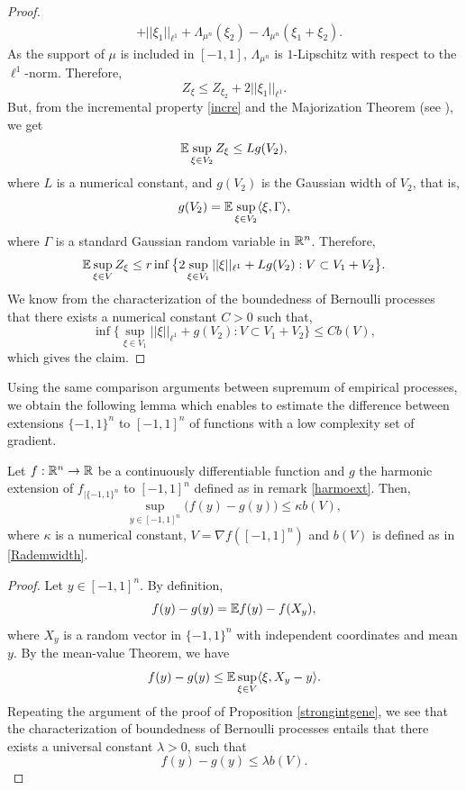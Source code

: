 \documentclass[a4paper,oneside,11pt]{article}
\begin{document}
\begin{proof}
\begin{align*}
& + ||\xi_1||_{\ell^1} +  \Lambda_{\mu^n}(\xi_2)-\Lambda_{\mu^n}(\xi_1+\xi_2).
\end{align*}
As the support of $\mu$ is included in $[-1,1]$, $\Lambda_{\mu^n}$ is $1$-Lipschitz with respect to the $\ell^1$-norm. Therefore, 
$$  Z_{\xi} \leq Z_{\xi_2} + 2 ||\xi_1||_{\ell^1}.$$
But, from the incremental property \eqref{incre} and the Majorization Theorem (see \cite[Theorem 12.16]{LT}), we get 
$$ \mathbb{E} \sup_{\xi \in V_2 } Z_{\xi} \leq L g(V_2),$$
where $L$ is a numerical constant, and $g(V_2)$ is the Gaussian width of $V_2$, that is,
$$ g(V_2) = \mathbb{E} \sup_{\xi \in V_2} \langle \xi, \Gamma \rangle,$$
where $\Gamma$ is a standard Gaussian random variable in $\mathbb{R}^n$. Therefore,
$$ \mathbb{E} \sup_{\xi \in V} Z_{\xi} \leq r \inf\big\{ 2 \sup_{\xi \in V_1} ||\xi||_{\ell^1} + L g(V_2) : V \subset V_1 +V_2 \big\}.$$
We know from the characterization of the boundedness of Bernoulli processes \cite{BL} that there exists a numerical constant $C>0$ such that,
$$\inf\big\{ \sup_{\xi \in V_1} ||\xi||_{\ell^1} + g(V_2) : V \subset V_1 +V_2 \big\} \leq C  b(V),$$
which gives the claim.

\end{proof}
Using the same comparison arguments between supremum of empirical processes, we obtain the following lemma which enables to estimate the difference between extensions $\{-1,1\}^n$ to $[-1,1]^n$ of functions with a low complexity set of gradient. 
\begin{Lem} \label{exten}
Let $f : \mathbb{R}^n \to \mathbb{R}$ be a continuously differentiable function and $g$ the harmonic extension of $f_{|\{-1,1\}^n}$ to $[-1,1]^n$ defined as in remark \ref{harmoext}. Then,
$$ \sup_{ y \in [-1,1]^n } \big( f(y) -g(y) \big) \leq \kappa b(V),$$
where $\kappa$ is a numerical constant, $V = \nabla f( [-1,1]^n)$ and $b(V)$ is defined as in \eqref{Rademwidth}.
\end{Lem}
\begin{proof}
Let $y \in [-1,1]^n$. By definition,
$$  f(y)  - g(y)=  \mathbb{E} f(y) - f(X_y),$$
where $X_y$ is a  random vector in $\{-1,1\}^n$ with independent coordinates and mean $y$. 
By the mean-value Theorem, we have
$$ f(y) - g(y)\leq \mathbb{E} \sup_{ \xi \in V} \langle \xi, X_y-y \rangle.$$
Repeating the argument of the proof of Proposition \ref{strongintgene}, we see that the characterization of boundedness of Bernoulli processes \cite{BL} entails that there exists a universal constant $\lambda >0$, such that
$$ f(y)- g(y) \leq \lambda b(V).$$

\end{proof}
\end{document}
